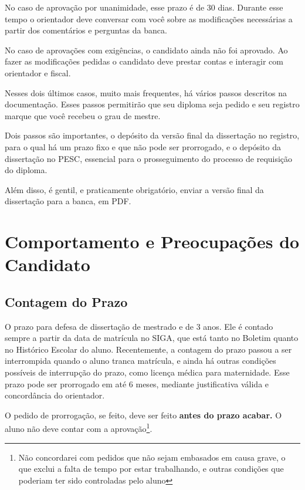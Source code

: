 \documentclass[a4paper,12pt]{article}
\begin{document}
No caso de aprovação por unanimidade, esse prazo é de 30 dias. Durante esse tempo o orientador deve conversar com você sobre as modificações necessárias a partir dos comentários e perguntas da banca.

No caso de aprovações com exigências, o candidato ainda não foi aprovado. Ao fazer as modificações pedidas o candidato deve prestar contas e interagir com orientador e fiscal.

Nesses dois últimos casos, muito mais frequentes, há vários passos descritos na documentação. Esses passos permitirão que seu diploma seja pedido e seu registro marque que você recebeu o grau de mestre.

Dois passos são importantes, o depósito da versão final da dissertação no registro, para o qual há um prazo fixo e que não pode ser prorrogado, e o depósito da dissertação no PESC, essencial para o prosseguimento do processo de requisição do diploma.

Além disso, é gentil, e praticamente obrigatório, enviar a versão final da dissertação para a banca, em PDF.

\section{Comportamento e Preocupações do Candidato}

\subsection{Contagem do Prazo}

O prazo para defesa de dissertação de mestrado e de 3 anos. Ele é contado sempre a partir da data de matrícula no SIGA, que está tanto no Boletim quanto no Histórico Escolar do aluno. Recentemente, a contagem do prazo passou a ser interrompida quando o aluno tranca matrícula, e ainda há outras condições possíveis de interrupção do prazo, como licença médica para maternidade. Esse prazo pode ser prorrogado em até 6 meses, mediante justificativa válida e concordância do orientador.

O pedido de prorrogação, se feito, deve ser feito \textbf{antes do prazo acabar.} O aluno não deve contar com a aprovação\footnote{Não concordarei com pedidos que não sejam embasados em causa grave, o que exclui a falta de tempo por estar trabalhando, e outras condições que poderiam ter sido controladas pelo aluno}.
\end{document}

